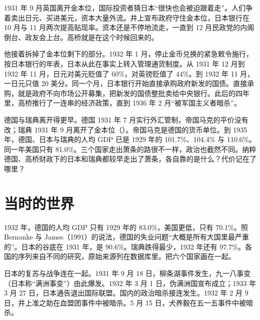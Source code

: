 1931 年 9 月英国离开金本位，国际投资者猜日本“很快也会被迫跟着走”\cite{shizume2009}。人们争着卖出日元、买进美元，资本大量外流\cite{shizume2009}。井上宣布政府守住金本位，日本银行在 10 月与 11 月两次提高贴现率\cite{shizume2009}。资本还是不停地流走，一直到 12 月民政党的内阁倒台、政友会上台\cite{shizume2009}。高桥就是在这个时候回来的。

他接着拆掉了金本位剩下的部分。1932 年 1 月，停止金币兑换的紧急敕令施行，按日本银行的年表，日本从此在事实上转入管理通货制度\cite{bojchron}。从 1931 年 12 月到 1932 年 11 月，日元对美元贬值了 60\%，对英镑贬值了 44\%\cite{shizume2009}。到 1932 年 11 月，一日元只值 20 美分\cite{shizume2009}。同一个月，日本银行开始直接承购政府新发的国债\cite{shizume2009}。直接承购，就是政府不向市场公开募集，把新发的国债整批卖给中央银行。此后的四年里，高桥推行了一连串的经济政策，直到 1936 年 2 月“被军国主义者暗杀”\cite{shizume2009}。

德国与瑞典离开得更早。德国 1931 年 7 月实行外汇管制，帝国马克的平价没有改；瑞典 1931 年 9 月离开了金本位（）。帝国马克是德国的货币单位。到 1935 年，德国、日本与瑞典的人均 GDP 已是 1929 年的 101.7\%、104.4\% 与 110.6\%\cite{mpd2023}。同一年美国只有 81.0\%\cite{mpd2023}。三个国家走出萧条的路很不一样，政治也截然不同。纳粹德国、高桥财政下的日本和瑞典都较早走出了萧条，各自靠的是什么？代价记在了哪里？

\section{当时的世界}\label{sec:alternatives-world}

1932 年，德国的人均 GDP 只有 1929 年的 83.0\%，美国更低，只有 70.1\%\cite{mpd2023}。照 Bernanke 与 James（1991）的说法，德国的失业问题“大概是所有大国里最严重的”\cite{bernanke1991}。日本的谷底在 1931 年，是 90.6\%\cite{mpd2023}。瑞典跌得最少，1932 年还有 97.7\%\cite{mpd2023}。各国的序列来自不同的研究，原始来源列在数据库里\cite{mpd29src}。把六个国家画在一起。


日本的复苏与战争连在一起。1931 年 9 月 18 日，柳条湖事件发生，九一八事变（日本称“满洲事变”）由此爆发\cite{ndl2026}。1932 年 3 月 1 日，伪满洲国宣布成立；1933 年 3 月 27 日，日本通告退出国际联盟\cite{ndl2026}。国内的政治暗杀接连发生。1932 年 2 月 9 日，井上准之助在血盟团事件中被暗杀\cite{ndl2026}。5 月 15 日，犬养毅在五一五事件中被暗杀\cite{ndl2026}。

